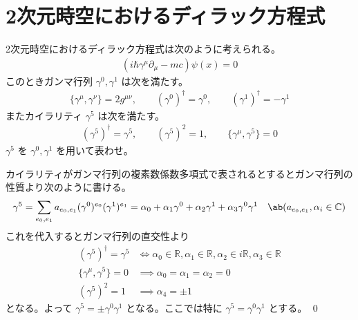 \documentclass[uplatex,dvipdfmx,a4paper,11pt]{jlreq}
\makeatletter
\newcommand{\CC}{\mathbb{C}}
\newcommand{\RR}{\mathbb{R}}
\numberwithin{equation}{section}
\theoremstyle{definition}
\renewenvironment{proof}[1][\proofname]{\par
  \normalfont
  \topsep6\p@\@plus6\p@ \trivlist
  \item[\hskip\labelsep{\bfseries #1}\@addpunct{\bfseries}]\ignorespaces\quad\par
}{%
  \qed\endtrivlist\@endpefalse
}
\renewcommand\proofname{証明}
\makeatother
\begin{document}
\section{2次元時空におけるディラック方程式}
\begin{problem}
2次元時空におけるディラック方程式は次のように考えられる。
\begin{align}
  (i\hbar\gamma^\mu\partial_\mu - mc)\psi(x) = 0
\end{align}
このときガンマ行列 $\gamma^0, \gamma^1$ は次を満たす。
\begin{align}
  \lbrace\gamma^\mu, \gamma^\nu\rbrace = 2g^{\mu\nu}, \qquad (\gamma^0)^\dagger = \gamma^0, \qquad (\gamma^1)^\dagger = - \gamma^1
\end{align}
またカイラリティ $\gamma^5$ は次を満たす。
\begin{align}
  (\gamma^5)^\dagger = \gamma^5, \qquad (\gamma^5)^2 = 1, \qquad \lbrace\gamma^\mu, \gamma^5\rbrace = 0
\end{align}
$\gamma^5$ を $\gamma^0, \gamma^1$ を用いて表わせ。
\end{problem}
\begin{proof}
  カイラリティがガンマ行列の複素数係数多項式で表されるとするとガンマ行列の性質より次のように書ける。
  \begin{align}
    \gamma^5 & = \sum_{e_0, e_1}a_{e_0,e_1}(\gamma^0)^{e_0}(\gamma^1)^{e_1} = \alpha_0 + \alpha_1\gamma^0 + \alpha_2\gamma^1 + \alpha_3\gamma^0\gamma^1 & \ab(a_{e_0, e_1}, \alpha_i\in\CC)
  \end{align}
  これを代入するとガンマ行列の直交性より
  \begin{align}
    (\gamma^5)^\dagger = \gamma^5          & \iff \alpha_0\in\RR, \alpha_1\in\RR, \alpha_2\in i\RR, \alpha_3\in\RR \\
    \lbrace\gamma^\mu, \gamma^5\rbrace = 0 & \implies \alpha_0 = \alpha_1 = \alpha_2 = 0                           \\
    (\gamma^5)^2 = 1                       & \implies \alpha_4 = \pm 1
  \end{align}
  となる。よって $\gamma^5 = \pm \gamma^0\gamma^1$ となる。ここでは特に $\gamma^5 = \gamma^0\gamma^1$ とする。
\end{proof}
\end{document}
